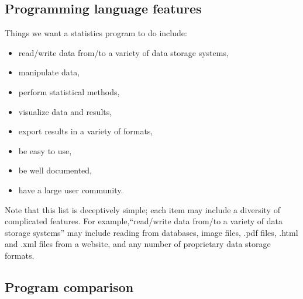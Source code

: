 \documentclass[]{book}
\providecommand{\tightlist}{%
  \setlength{\itemsep}{0pt}\setlength{\parskip}{0pt}}
\begin{document}
\hypertarget{programming-language-features}{%
\subsection{Programming language features}\label{programming-language-features}}

Things we want a statistics program to do include:

\begin{itemize}
\tightlist
\item
  read/write data from/to a variety of data storage systems,
\item
  manipulate data,
\item
  perform statistical methods,
\item
  visualize data and results,
\item
  export results in a variety of formats,
\item
  be easy to use,
\item
  be well documented,
\item
  have a large user community.
\end{itemize}

Note that this list is deceptively simple; each item may include a diversity of complicated features. For example,``read/write data from/to a variety of data storage systems'' may include reading from databases, image files, .pdf files, .html and .xml files from a website, and any number of proprietary data storage formats.

\hypertarget{program-comparison}{%
\subsection{Program comparison}\label{program-comparison}}
\end{document}
